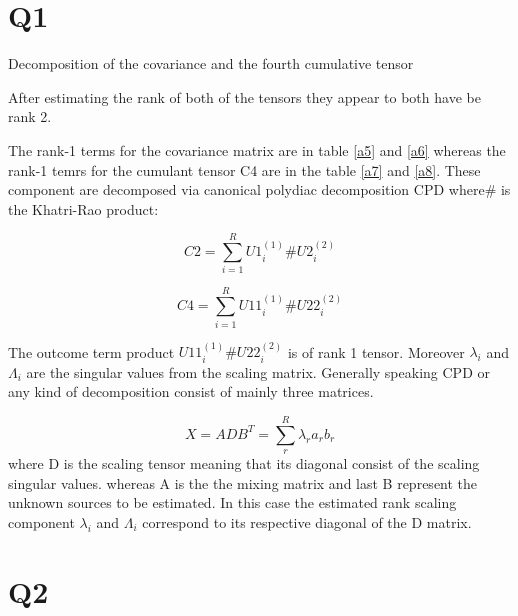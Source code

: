 \section{Q1}
Decomposition of the covariance and the fourth cumulative tensor


After estimating the rank of both of the tensors they appear to both have be rank 2. 

The rank-1 terms for the covariance matrix are in table \ref{a5} and \ref{a6} whereas the rank-1 temrs for the cumulant tensor C4 are in the table \ref{a7} and \ref{a8}.
These component are decomposed via canonical polydiac decomposition CPD where$\#$ is the Khatri-Rao product:

\begin{equation}
C2=\sum_{i=1}^{R}U1_{i}^{(1)}\#U2_{i}^{(2)}
\end{equation}

\begin{equation}
C4=\sum_{i=1}^{R}U11_{i}^{(1)}\#U22_{i}^{(2)}
\end{equation}

The outcome term product $U11_{i}^{(1)}\#U22_{i}^{(2)}$ is of rank 1 tensor.
Moreover $\lambda_{i}$ and $\Lambda_{i}$ are the singular values from the scaling matrix. Generally speaking CPD or any kind of decomposition consist of mainly three matrices.

\begin{equation}
X=ADB^T=\sum_{r}^{R}\lambda_{r}a_{r}b_{r}
\end{equation}
where D is the scaling tensor meaning that its diagonal consist of the scaling singular values. whereas A is the the mixing matrix and last B represent the unknown sources to be estimated\cite{19}. In this case the estimated rank scaling component $\lambda_{i}$ and $\Lambda_{i}$ correspond to its respective diagonal of the D matrix. 

\section{Q2}

